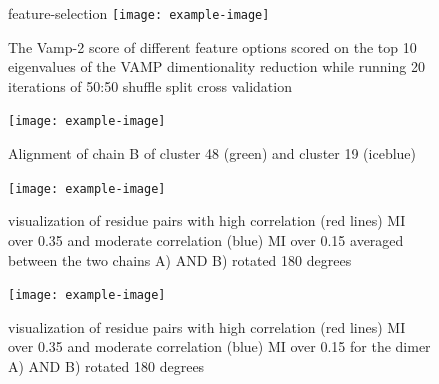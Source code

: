 \documentclass{biophys-new}
\begin{document}
\begin{figure}[h]
feature-selection
\centering
\texttt{[image: example-image]}
\caption{The Vamp-2 score of different feature options scored on the top 10 eigenvalues of the VAMP dimentionality reduction while running 20 iterations of 50:50 shuffle split cross validation}
\label{fig:view}
\end{figure}

\begin{figure}[alignment-linker-helix]
\centering
\texttt{[image: example-image]}
\caption{Alignment of chain B of cluster 48 (green) and cluster 19 (iceblue)}
\label{fig:view}
\end{figure}

\begin{figure}[mutual-information-average]
\centering
\texttt{[image: example-image]}
\caption{visualization of residue pairs with high correlation (red lines) MI over 0.35 and moderate correlation (blue) MI over 0.15 averaged between the two chains A) AND B) rotated 180 degrees}
\label{fig:view}
\end{figure}

\begin{figure}[mutual-information-average]
\centering
\texttt{[image: example-image]}
\caption{visualization of residue pairs with high correlation (red lines) MI over 0.35 and moderate correlation (blue) MI over 0.15 for the dimer A) AND B) rotated 180 degrees}
\label{fig:view}
\end{figure}
\end{document}
